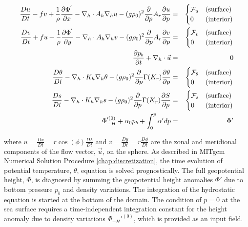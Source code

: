 \begin{eqnarray}
\label{EQ:eg-global-model_equations_pcoord}
\frac{Du}{Dt} - fv + 
  \frac{1}{\rho}\frac{\partial \Phi^{'}}{\partial x} - 
  \nabla_{h}\cdot A_{h}\nabla_{h}u - 
  (g\rho_0)^2\frac{\partial}{\partial p}A_{r}\frac{\partial u}{\partial p} 
 & = &
\begin{cases}
{\cal F}_u & \text{(surface)} \\
0 & \text{(interior)}
\end{cases}
\\
\frac{Dv}{Dt} + fu + 
  \frac{1}{\rho}\frac{\partial \Phi^{'}}{\partial y} - 
  \nabla_{h}\cdot A_{h}\nabla_{h}v - 
  (g\rho_0)^2\frac{\partial}{\partial p}A_{r}\frac{\partial v}{\partial p} 
& = &
\begin{cases}
{\cal F}_v & \text{(surface)} \\
0 & \text{(interior)}
\end{cases}
\\
\frac{\partial p_{b}}{\partial t} + \nabla_{h}\cdot \vec{u}
&=&
0
\\
\frac{D\theta}{Dt} -
 \nabla_{h}\cdot K_{h}\nabla_{h}\theta
 - (g\rho_0)^2\frac{\partial}{\partial p}\Gamma(K_{r})\frac{\partial\theta}{\partial p} 
& = &
\begin{cases}
{\cal F}_\theta & \text{(surface)} \\
0 & \text{(interior)}
\end{cases}
\\
\frac{D s}{Dt} -
 \nabla_{h}\cdot K_{h}\nabla_{h}s
 - (g\rho_0)^2\frac{\partial}{\partial p}\Gamma(K_{r})\frac{\partial S}{\partial p} 
& = &
\begin{cases}
{\cal F}_s & \text{(surface)} \\
0 & \text{(interior)}
\end{cases}
\\
\Phi_{-H}'^{(0)} + \alpha_{0}p_{b}+ \int^{p}_{0}\alpha' dp & = & \Phi'
\end{eqnarray}

\noindent where $u=\frac{Dx}{Dt}=r \cos(\phi)\frac{D \lambda}{Dt}$ and 
$v=\frac{Dy}{Dt}=r \frac{D \phi}{Dt}$ are the zonal and meridional
components of the flow vector, $\vec{u}$, on the sphere. As described
in MITgcm Numerical Solution Procedure \ref{chap:discretization}, the
time evolution of potential temperature, $\theta$, equation is solved
prognostically. The full geopotential height, $\Phi$, is diagnosed by
summing the geopotential height anomalies $\Phi'$ due to bottom
pressure $p_{b}$ and density variations. The integration of the
hydrostatic equation is started at the bottom of the domain. The
condition of $p=0$ at the sea surface requires a time-independent
integration constant for the height anomaly due to density variations
$\Phi_{-H}'^{(0)}$, which is provided as an input field.


